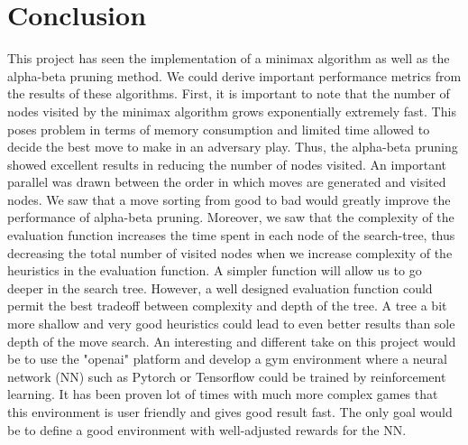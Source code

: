\documentclass{article}
\begin{document}
\section{Conclusion}
This project has seen the implementation of a minimax algorithm as well as the alpha-beta pruning method. We could derive important performance metrics from the results of these algorithms. First, it is important to note that the number of nodes visited by the minimax algorithm grows exponentially extremely fast. This poses problem in terms of memory consumption and limited time allowed to decide the best move to make in an adversary play. Thus, the alpha-beta pruning showed excellent results in reducing the number of nodes visited. 
An important parallel was drawn between the order in which moves are generated and visited nodes. We saw that a move sorting from good to bad would greatly improve the performance of alpha-beta pruning. 
Moreover, we saw that the complexity of the evaluation function increases the time spent in each node of the search-tree, thus decreasing the total number of visited nodes when we increase complexity of the heuristics in the evaluation function. A simpler function will allow us to go deeper in the search tree. However, a well designed evaluation function could permit the best tradeoff between complexity and depth of the tree. A tree a bit more shallow and very good heuristics could lead to even better results than sole depth of the move search.
An interesting and different take on this project would be to use the "openai" platform and develop a gym environment where a neural network (NN) such as Pytorch or Tensorflow could be trained by reinforcement learning. It has been proven lot of times with much more complex games that this environment is user friendly and gives good result fast. The only goal would be to define a good environment with well-adjusted rewards for the NN.
\end{document}
